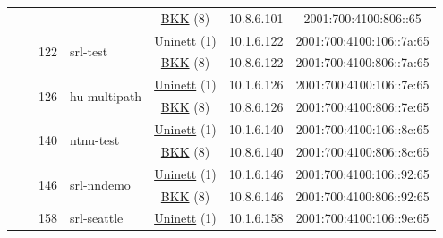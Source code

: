 \begin{small}
\begin{center}
\begin{longtable}{|c|c|c|c|c|c|c|c|}
  &  & \multicolumn{2}{|c|}{} & \multicolumn{2}{|c|}{\tiny{\href{http://bkk.no}{BKK} (8)}} & \tiny{10.8.6.101} & \tiny{2001:700:4100:806::65} \\* \cline{3-3}\cline{4-4}\cline{5-5}\cline{6-6}\cline{7-7}\cline{8-8}
  &  & \multirow{2}{*}{\tiny{122}} & \multicolumn{1}{|l|}{\multirow{2}{*}{\tiny{srl-test}}} & \multicolumn{2}{|c|}{\tiny{\href{https://www.uninett.no}{Uninett} (1)}} & \tiny{10.1.6.122} & \tiny{2001:700:4100:106::7a:65} \\* \cline{5-5}\cline{6-6}\cline{7-7}\cline{8-8}
  &  &  &  & \multicolumn{2}{|c|}{\tiny{\href{http://bkk.no}{BKK} (8)}} & \tiny{10.8.6.122} & \tiny{2001:700:4100:806::7a:65} \\* \cline{3-3}\cline{4-4}\cline{5-5}\cline{6-6}\cline{7-7}\cline{8-8}
  &  & \multirow{2}{*}{\tiny{126}} & \multicolumn{1}{|l|}{\multirow{2}{*}{\tiny{hu-multipath}}} & \multicolumn{2}{|c|}{\tiny{\href{https://www.uninett.no}{Uninett} (1)}} & \tiny{10.1.6.126} & \tiny{2001:700:4100:106::7e:65} \\* \cline{5-5}\cline{6-6}\cline{7-7}\cline{8-8}
  &  &  &  & \multicolumn{2}{|c|}{\tiny{\href{http://bkk.no}{BKK} (8)}} & \tiny{10.8.6.126} & \tiny{2001:700:4100:806::7e:65} \\* \cline{3-3}\cline{4-4}\cline{5-5}\cline{6-6}\cline{7-7}\cline{8-8}
  &  & \multirow{2}{*}{\tiny{140}} & \multicolumn{1}{|l|}{\multirow{2}{*}{\tiny{ntnu-test}}} & \multicolumn{2}{|c|}{\tiny{\href{https://www.uninett.no}{Uninett} (1)}} & \tiny{10.1.6.140} & \tiny{2001:700:4100:106::8c:65} \\* \cline{5-5}\cline{6-6}\cline{7-7}\cline{8-8}
  &  &  &  & \multicolumn{2}{|c|}{\tiny{\href{http://bkk.no}{BKK} (8)}} & \tiny{10.8.6.140} & \tiny{2001:700:4100:806::8c:65} \\* \cline{3-3}\cline{4-4}\cline{5-5}\cline{6-6}\cline{7-7}\cline{8-8}
  &  & \multirow{2}{*}{\tiny{146}} & \multicolumn{1}{|l|}{\multirow{2}{*}{\tiny{srl-nndemo}}} & \multicolumn{2}{|c|}{\tiny{\href{https://www.uninett.no}{Uninett} (1)}} & \tiny{10.1.6.146} & \tiny{2001:700:4100:106::92:65} \\* \cline{5-5}\cline{6-6}\cline{7-7}\cline{8-8}
  &  &  &  & \multicolumn{2}{|c|}{\tiny{\href{http://bkk.no}{BKK} (8)}} & \tiny{10.8.6.146} & \tiny{2001:700:4100:806::92:65} \\* \cline{3-3}\cline{4-4}\cline{5-5}\cline{6-6}\cline{7-7}\cline{8-8}
  &  & \multirow{2}{*}{\tiny{158}} & \multicolumn{1}{|l|}{\multirow{2}{*}{\tiny{srl-seattle}}} & \multicolumn{2}{|c|}{\tiny{\href{https://www.uninett.no}{Uninett} (1)}} & \tiny{10.1.6.158} & \tiny{2001:700:4100:106::9e:65} \\* \cline{5-5}\cline{6-6}\cline{7-7}\cline{8-8}

\end{longtable}
\end{center}
\end{small}
